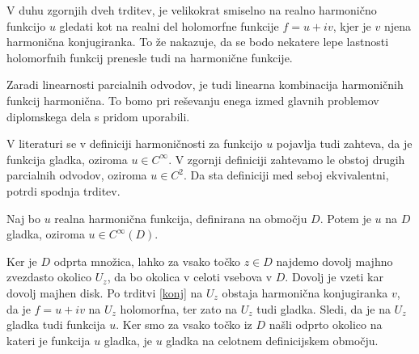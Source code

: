 \documentclass[mat1]{fmfdelo}
\begin{document}
    \begin{opomba}
        V duhu zgornjih dveh trditev, je velikokrat smiselno na realno harmonično funkcijo $u$ gledati kot na realni del holomorfne funkcije $f = u + iv$, kjer je $v$ njena harmonična konjugiranka. To že nakazuje, da se bodo nekatere lepe lastnosti holomorfnih funkcij prenesle tudi na harmonične funkcije.
    \end{opomba}
    \begin{opomba}
        \label{lin}
        Zaradi linearnosti parcialnih odvodov, je tudi linearna kombinacija harmoničnih funkcij harmonična. To bomo pri reševanju enega izmed glavnih problemov diplomskega dela s pridom uporabili.
    \end{opomba}
    \begin{opomba}
        V literaturi se v definiciji harmoničnosti za funkcijo $u$ pojavlja tudi zahteva, da je funkcija gladka, oziroma $u \in C^{\infty}$. V zgornji definiciji zahtevamo le obstoj drugih parcialnih odvodov, oziroma $u \in C^2$. 
        Da sta definiciji med seboj ekvivalentni, potrdi spodnja trditev. 
    \end{opomba}
    \begin{trditev}
        \label{gladkosth}
        Naj bo $u$ realna harmonična funkcija, definirana na območju $D$. Potem je $u$ na $D$ gladka, oziroma $u \in C^{\infty}(D)$. 
    \end{trditev}
    \begin{dokaz}
        Ker je  $D$ odprta množica, lahko za vsako točko $z \in D$ najdemo dovolj majhno zvezdasto okolico $U_z$, da bo okolica v celoti vsebova v $D$. Dovolj je vzeti kar dovolj majhen disk. 
        Po trditvi \ref{konj} na $U_z$ obstaja harmonična konjugiranka $v$, da je $f = u+ iv$ na $U_z$ holomorfna, ter zato na $U_z$ tudi gladka. Sledi, da je na $U_z$ gladka tudi funkcija $u$.
        Ker smo za vsako točko iz $D$ našli odprto okolico na kateri je funkcija $u$ gladka, je $u$ gladka na celotnem definicijskem območju.
    \end{dokaz}
\end{document}
